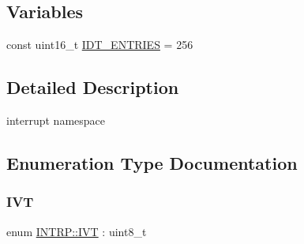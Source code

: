 \subsection*{Variables}
\begin{DoxyCompactItemize}
\item 
const uint16\+\_\+t \hyperlink{namespace_i_n_t_r_p_a1022b4dc1d9af1ea393f7f038ff421ce}{I\+D\+T\+\_\+\+E\+N\+T\+R\+I\+ES} = 256
\end{DoxyCompactItemize}


\subsection{Detailed Description}
interrupt namespace 

\subsection{Enumeration Type Documentation}
\mbox{\label{namespace_i_n_t_r_p_a790699fb2953ef4ab70c7dc7148a1c94}} 
\subsubsection{\texorpdfstring{I\+VT}{IVT}}
{\footnotesize\ttfamily enum \hyperlink{namespace_i_n_t_r_p_a790699fb2953ef4ab70c7dc7148a1c94}{I\+N\+T\+R\+P\+::\+I\+VT} \+: uint8\+\_\+t}

